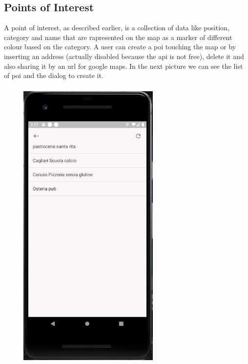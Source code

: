 \documentclass[../../main]{subfiles}
\begin{document}
\subsection{Points of Interest}
\label{ss:final-poi}

A point of interest, as described earlier, is a collection of data like position, category and name that are rapresented on the map as a marker of 
different colour based on the category. A user can create a poi touching the map or by inserting an address (actually disabled because the api is not free),
 delete it and also sharing it by an url for google maps.
In the next picture we can see the list of poi and the dialog to create it.
\begin{figure}[H]
    \centering
    \includegraphics[width=70mm,height=150mm]{images/app/poi/poi_overview.png}

\end{figure}
\end{document}
